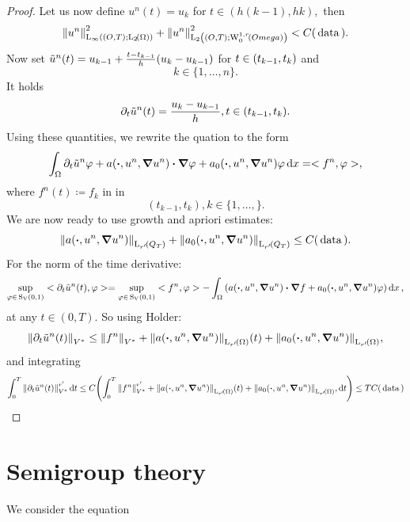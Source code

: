 \documentclass{article}
\begin{document}
\begin{proof}
Let us now define $u^n(t) = u_k$ for $t \in (h(k-1),hk),$ then
\[
	\NormLinfIntX{u^n}{O}{T}{\LpSet[2]{\Omega}}^{2} + \NormLpIntX{u^n}{2}{O}{T}{\WkpzeroSet[1][r]{Omega}}^{2} < C(\, \text{data} \,).
\]
Now set $\tilde{u}^n(t) = u_{k-1}+ \frac{t-t_{k-1}}{h}\qty(u_k-u_{k-1})$ for $t \in \qty(t_{k-1},t_k)$ and
\[
	k \in \{1, \dots, n\}.
\]
It holds
\[
	\partial_t \tilde{u}^n(t) = \frac{u_k-u_{k-1}}{h}, t \in \qty(t_{k-1},t_k).
\]
Using these quantities, we rewrite the quation to the form
\[
	\int_{\Omega}\partial_t \tilde{u}^n \varphi + a\qty(\vdot, u^n, \grad u^n)\vdot \grad \varphi + a_0\qty(\vdot, u^n, \grad u^n) \varphi\dd{x} = <f^n, \varphi>,
\]
where $f^n(t) \coloneq f_k$ in in
\[
	(t_{k-1}, t_k), k \in \{1,\dots,\}.
\]
We are now ready to use growth and apriori estimates:
\[
	\norm{a\qty(\vdot, u^n, \grad u^n)}_{\LpSet[r']{Q_T}} + \norm{a_0\qty(\vdot, u^n, \grad u^n)}_{\LpSet[r']{Q_T}} \leq C(\, \text{data} \,).
\]
For the norm of the time derivative:
\[
	\sup_{\varphi \in \, \text{S}_\text{V}(0,1)} <\partial_t \tilde{u}^n(t), \varphi> =  \sup_{\varphi \in \, \text{S}_\text{V}(0,1)} <f^n, \varphi> - \int_{\Omega}\qty(a\qty(\vdot, u^n, \grad u^n)\vdot \grad f + a_0\qty(\vdot, u^n, \grad u^n)\varphi)\dd{x},
\]
at any $t \in (0,T)$. So using Holder:
\[
	\norm{\partial_t \tilde{u}^n(t)}_{V^{*}} \leq \norm{f^n}_{V^{*}} + \norm{a\qty(\vdot, u^n, \grad u^n)}_{\LpSet[r']{\Omega}}(t) + \norm{a_0\qty(\vdot, u^n, \grad u^n)}_{\LpSet[r']{\Omega}},
\]
and integrating
\[
	\int_0^T \norm{\partial_t \tilde{u}^n(t)}_{V^{*}}^{r'} \dd{t} \leq C\qty(\int_0^T \norm{f^n}_{V^{*}}^{r'}+ \norm{a\qty(\vdot, u^n, \grad u^n)}_{\LpSet[r']{\Omega}}(t) + \norm{a_0\qty(\vdot, u^n, \grad u^n)}_{\LpSet[r']{\Omega}},
	\dd{t}) \leq T C\qty(\, \text{data} \,)
\]
\end{proof}

\section{Semigroup theory}
\label{sec:semigroups}
We consider the equation
\end{document}
